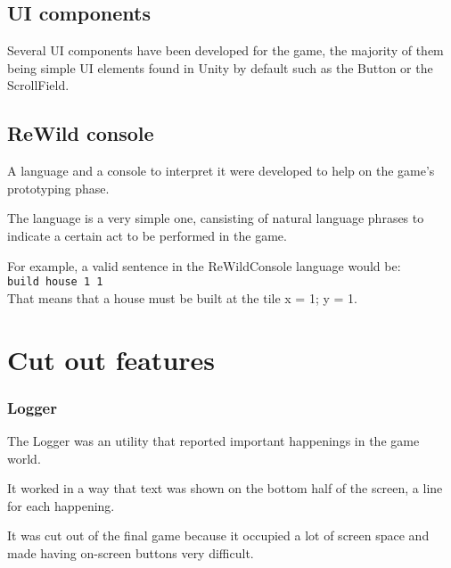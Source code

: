 \subsection{UI components}

Several UI components have been developed for the game, the majority of
them being simple UI elements found in Unity by default such as the
Button or the ScrollField.

\subsection{ReWild console}

A language and a console to interpret it were developed to help on the
game's prototyping phase.

The language is a very simple one, cansisting of natural language phrases
to indicate a certain act to be performed in the game.

For example, a valid sentence in the ReWildConsole language would be:
\\
\texttt{build house 1 1}
\\

That means that a house must be built at the tile x = 1; y = 1.

\section{Cut out features}

\subsubsection{Logger}

The Logger was an utility that reported important happenings in the game world.

It worked in a way that text was shown on the bottom half of the screen,
a line for each happening.

It was cut out of the final game because it occupied a lot of screen space
and made having on-screen buttons very difficult.
